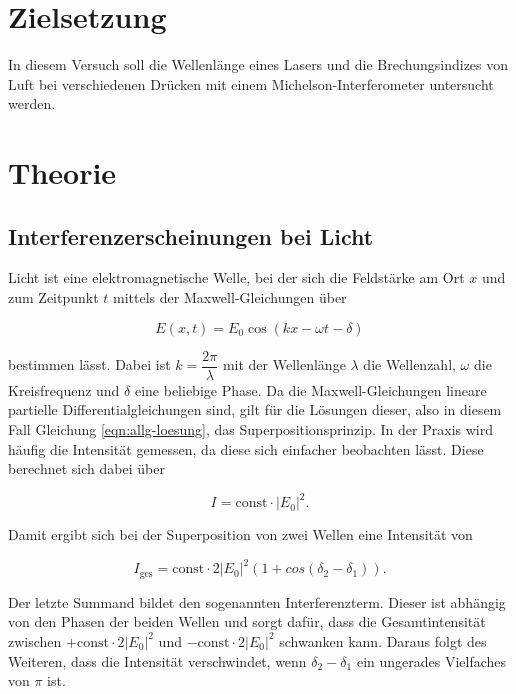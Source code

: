 \section{Zielsetzung}

In diesem Versuch soll die Wellenlänge eines Lasers und die Brechungsindizes von Luft bei verschiedenen Drücken mit einem Michelson-Interferometer untersucht werden.

\section{Theorie}
\label{sec:Theorie}

\subsection{Interferenzerscheinungen bei Licht}

Licht ist eine elektromagnetische Welle, bei der sich die Feldstärke am Ort $x$ und zum Zeitpunkt $t$ mittels der Maxwell-Gleichungen über

\begin{equation}
    \label{eqn:allg-loesung}
    E(x,t) = E_0 \cos(kx - \omega t - \delta)
\end{equation}

bestimmen lässt. Dabei ist $k = \dfrac{2\pi}{\lambda}$ mit der Wellenlänge $\lambda$ die Wellenzahl, $\omega$ die Kreisfrequenz und $\delta$ eine beliebige Phase.
Da die Maxwell-Gleichungen lineare partielle Differentialgleichungen sind, gilt für die Lösungen dieser, also in diesem Fall Gleichung \eqref{eqn:allg-loesung}, das Superpositionsprinzip.
In der Praxis wird häufig die Intensität gemessen, da diese sich einfacher beobachten lässt. Diese berechnet sich dabei über

\begin{equation}
    \label{eqn:intensitaet}
    I = \text{const} \cdot |E_0|^2.
\end{equation}

Damit ergibt sich bei der Superposition von zwei Wellen eine Intensität von

\begin{equation}
    I_\text{ges} = \text{const} \cdot 2 |E_0|^2 (1 + cos(\delta_2 - \delta_1)).
\end{equation}

Der letzte Summand bildet den sogenannten Interferenzterm. Dieser ist abhängig von den Phasen der beiden Wellen und sorgt dafür, dass die Gesamtintensität zwischen $+ \text{const} \cdot 2 |E_0|^2$ und $- \text{const} \cdot 2 |E_0|^2$ schwanken kann.
Daraus folgt des Weiteren, dass die Intensität verschwindet, wenn $\delta_2 - \delta_1$ ein ungerades Vielfaches von $\pi$ ist.

